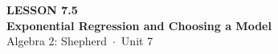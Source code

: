 \documentclass[aspectratio=169, 11pt]{beamer}
\begin{document}
{
\begin{frame}[plain]
  \vspace{2.8cm}\hspace{0.55cm}%
  \begin{minipage}{0.9\textwidth}
    {\color{goldacc}\bfseries\small LESSON 7.5}\\[0.5cm]
    {\color{white}\bfseries\LARGE Exponential Regression and Choosing a Model}\\[1.2cm]
    {\color{forestmid}\small Algebra 2: Shepherd~$\cdot$~Unit 7}
  \end{minipage}
\end{frame}
}

\begin{frame}[t, plain]
\end{frame}
\end{document}

